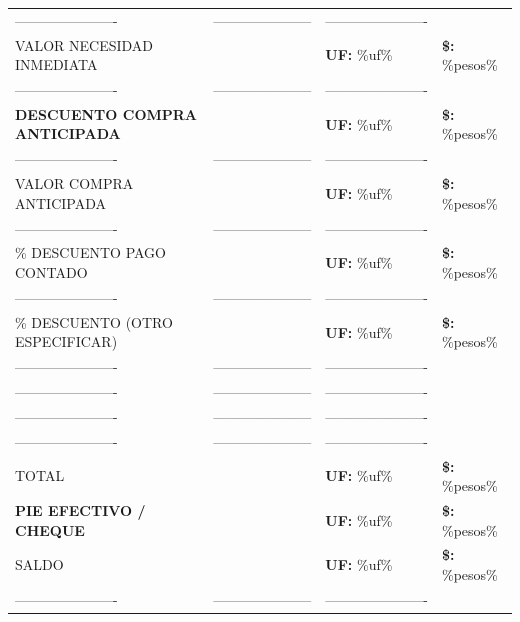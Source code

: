 \documentclass[10pt]{article}
\begin{document}
\begin{tabular}{llll}
\hline
\color{white}---------------------- & \color{white}--------------------- & \color{white}---------------------- \\
VALOR NECESIDAD INMEDIATA &  & \textbf{UF: } \%uf\% & \textbf{\$: } \%pesos\% \\
\color{white}---------------------- & \color{white}--------------------- & \color{white}---------------------- \\
\textbf{DESCUENTO COMPRA ANTICIPADA} & & \textbf{UF: } \%uf\% & \textbf{\$: } \%pesos\% \\
\color{white}---------------------- & \color{white}--------------------- & \color{white}---------------------- \\
VALOR COMPRA ANTICIPADA &  & \textbf{UF: } \%uf\% & \textbf{\$: } \%pesos\% \\
\color{white}---------------------- & \color{white}--------------------- & \color{white}---------------------- \\
\% DESCUENTO PAGO CONTADO &  & \textbf{UF: } \%uf\% & \textbf{\$: } \%pesos\% \\
\color{white}---------------------- & \color{white}--------------------- & \color{white}---------------------- \\
\% DESCUENTO (OTRO ESPECIFICAR) &  & \textbf{UF: } \%uf\% & \textbf{\$: } \%pesos\% \\
\color{white}---------------------- & \color{white}--------------------- & \color{white}---------------------- \\
\color{white}---------------------- & \color{white}--------------------- & \color{white}---------------------- \\
\color{white}---------------------- & \color{white}--------------------- & \color{white}---------------------- \\
\color{white}---------------------- & \color{white}--------------------- & \color{white}---------------------- \\
TOTAL &  & \textbf{UF: } \%uf\% & \textbf{\$: } \%pesos\% \\
\textbf{PIE EFECTIVO / CHEQUE} &  & \textbf{UF: } \%uf\% & \textbf{\$: } \%pesos\% \\
SALDO &  & \textbf{UF: } \%uf\% & \textbf{\$: } \%pesos\% \\
\color{white}---------------------- & \color{white}--------------------- & \color{white}---------------------- \\
\hline
\end{tabular}
\end{document}
